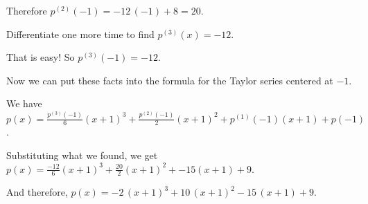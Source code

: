 \documentclass{ximera}
\begin{document}
\begin{question}
\begin{solution}
\begin{hint}
                \end{hint}
                \begin{hint}
                  Therefore \(p^{(2)}(-1) = -12 \, \left( -1 \right) + 8 = 20\).
                \end{hint}
                \begin{hint}
                  Differentiate one more time to find \(p^{(3)}(x) = -12\).
                \end{hint}
                \begin{hint}
                  That is easy!  So \(p^{(3)}(-1) = -12\).
                \end{hint}
                \begin{hint}
                  Now we can put these facts into the formula for the Taylor series centered at \(-1\).
                \end{hint}
                \begin{hint}
                  We have \(p(x) = \displaystyle\frac{p^{(3)}(-1)}{6} \left(x + 1\right)^3 + \displaystyle\frac{p^{(2)}(-1)}{2} \left(x + 1\right)^2 + p^{(1)}(-1) \left(x + 1\right) + p(-1)\).
                \end{hint}
                \begin{hint}
                  Substituting what we found, we get \(p(x) = \displaystyle\frac{-12}{6} \left(x + 1\right)^3 + \displaystyle\frac{20}{2} \left(x + 1\right)^2 + -15 \left(x + 1\right) + 9\).
                \end{hint}
                \begin{hint}
                  And therefore, \(p(x) = -2 \, \left( x + 1 \right)^{3} + 10 \, \left( x + 1 \right)^{2} - 15 \, \left( x + 1 \right) + 9\).

                \end{hint}


              \begin{multiple-choice}

              \end{multiple-choice}

              \end{solution}
            \end{question}
            
\end{document}
